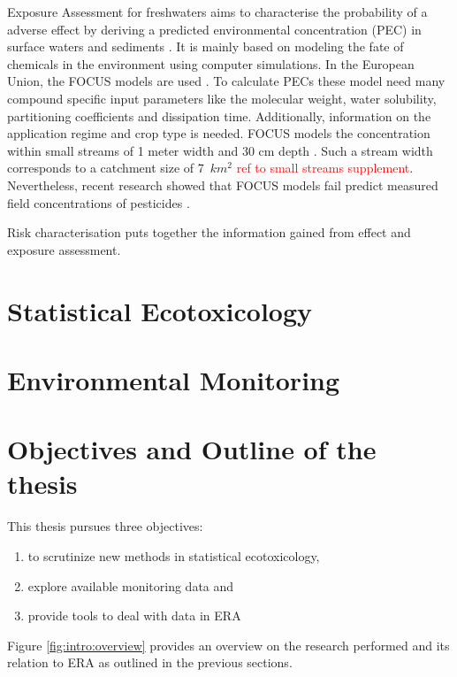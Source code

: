 Exposure Assessment for freshwaters aims to characterise the probability of a adverse effect by deriving a predicted environmental concentration (PEC) in surface waters and sediments \citep{newman_fundamentals_2015}. 
It is mainly based on modeling the fate of chemicals in the environment using computer simulations. 
In the European Union, the FOCUS models are used \citep{focus_focus_2001}.
To calculate PECs these model need many compound specific input parameters like the molecular weight, water solubility, partitioning coefficients and dissipation time. 
Additionally, information on the application regime and crop type is needed. 
FOCUS models the concentration within small streams of 1 meter width and 30 cm depth \citep{erlacher_regulation_2011}. 
Such a stream width corresponds to a catchment size of 7~$km^2$ \textcolor{red}{ref to small streams supplement}.
Nevertheless, recent research showed that FOCUS models fail predict measured field concentrations of pesticides \citep{knabel_regulatory_2012, knabel_fungicide_2014}. 

Risk characterisation puts together the information gained from effect and exposure assessment. %


\section{Statistical Ecotoxicology}



\section{Environmental Monitoring}







\section{Objectives and Outline of the thesis}
This thesis pursues three objectives: 
\begin{enumerate}[i]
	\item to scrutinize new methods in statistical ecotoxicology,
	\item explore available monitoring data and
	\item provide tools to deal with data in ERA
\end{enumerate}
Figure \ref{fig:intro:overview} provides an overview on the research performed and its relation to ERA as outlined in the previous sections.


